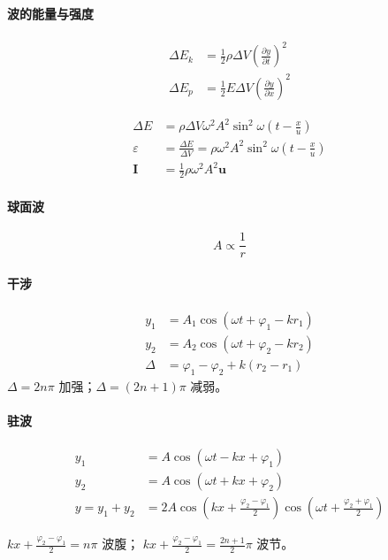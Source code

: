 \documentclass[12pt,a4paper]{article}
\numberwithin{equation}{section}
\begin{document}
\begin{CJK}{UTF8}{gbsn}
\paragraph{波的能量与强度}
\begin{align}
  \Delta E_k&=\frac{1}{2}\rho\Delta V \left( \frac{\partial y}{\partial t} \right)^2 \\
  \Delta E_p&=\frac{1}{2}E\Delta V \left( \frac{\partial y}{\partial x} \right)^2
\end{align}

\begin{align}
    \Delta E&=\rho \Delta V \omega^2 A^2 \sin^2\omega \left( t-\frac{x}{u} \right) \\
    \varepsilon &=\frac{\Delta E}{\Delta V}=\rho \omega^2 A^2 \sin^2\omega \left( t-\frac{x}{u} \right) \\
    \bm{I}&=\frac{1}{2} \rho \omega^2 A^2 \bm{u}
\end{align}

\paragraph{球面波}
\begin{equation}
  A\propto \frac{1}{r}
\end{equation}

\paragraph{干涉}
\begin{align}
  y_1 &=A_1\cos(\omega t+\varphi_1-kr_1) \\
  y_2 &=A_2\cos(\omega t+\varphi_2-kr_2) \\
  \Delta &= \varphi_1 - \varphi_2 +k(r_2-r_1)
\end{align}
$\Delta=2n\pi$ 加强；$\Delta=(2n+1)\pi$ 减弱。

\paragraph{驻波}
\begin{align}
  y_1 &=A\cos(\omega t-kx+\varphi_1) \\
  y_2 &=A\cos(\omega t+kx+\varphi_2) \\
  y=y_1+y_2&=2A\cos\left( kx+\frac{\varphi_2-\varphi_1}{2} \right)\cos\left( \omega t+ \frac{\varphi_2+\varphi_1}{2} \right)
\end{align}

$kx+\frac{\varphi_2-\varphi_1}{2}=n\pi$ 波腹； $kx+\frac{\varphi_2-\varphi_1}{2}=\frac{2n+1}{2}\pi$ 波节。


\end{CJK}
\end{document}
